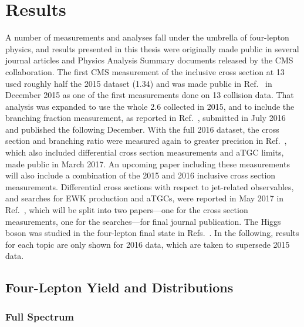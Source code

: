 
\chapter{Results}

A number of measurements and analyses fall under the umbrella of four-lepton physics, and results presented in this thesis were originally made public in several journal articles and Physics Analysis Summary documents released by the CMS collaboration.
The first CMS measurement of the {\ZZ} inclusive cross section at {13\TeV} used roughly half the 2015 dataset ({1.34\fbinv}) and was made public in Ref.~\cite{CMS:2015fnj} in December 2015 as one of the first measurements done on {13\TeV} collision data.
That analysis was expanded to use the whole {2.6\fbinv} collected in 2015, and to include the {\Zfourl} branching fraction measurement, as reported in Ref.~\cite{Khachatryan:2016txa}, submitted in July 2016 and published the following December.
With the full 2016 dataset, the {\ZZ} cross section and {\Zfourl} branching ratio were measured again to greater precision in Ref.~\cite{CMS:2017ruh}, which also included differential cross section measurements and aTGC limits, made public in March 2017.
An upcoming paper including these measurements will also include a combination of the 2015 and 2016 inclusive cross section measurements.
Differential cross sections with respect to jet-related observables, and searches for EWK {\ZZ} production and aTGCs, were reported in May 2017 in Ref.~\cite{CMS:2017dyw}, which will be split into two papers---one for the cross section measurements, one for the searches---for final journal publication.
The Higgs boson was studied in the four-lepton final state in Refs.~\cite{CMS:2016rqf,CMS:2016ilx,Sirunyan:2017exp}.
In the following, results for each topic are only shown for 2016 data, which are taken to supersede 2015 data.



\section{Four-Lepton Yield and Distributions}


\subsection{Full Spectrum}

